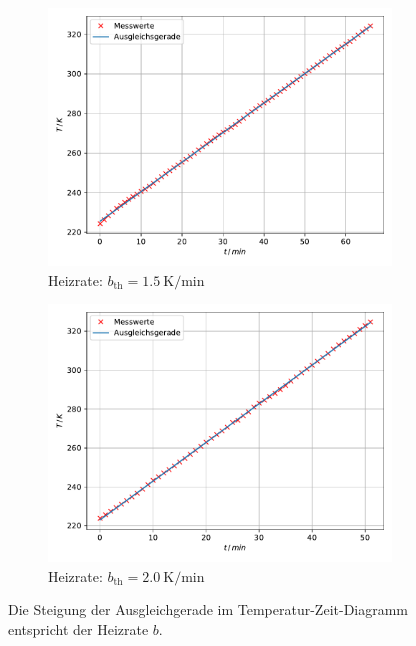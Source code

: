 \begin{figure}
    \begin{subfigure}{0.48\textwidth}
        \centering
        \includegraphics[height=0.8\textwidth]{content/data/char_relaxationszeit_15.pdf}
        \caption{Heizrate: $b_\text{th} = \SI{1.5}{\kelvin \per \minute}$}
        \label{subfig:t_T_15}
    \end{subfigure}
    \hfill
    \begin{subfigure}{0.48\textwidth}
        \centering
        \includegraphics[height=0.8\textwidth]{content/data/char_relaxationszeit_20.pdf}
        \caption{Heizrate: $b_\text{th} = \SI{2.0}{\kelvin \per \minute}$}
        \label{subfig:t_T_20}
    \end{subfigure}
    \caption{Die Steigung der Ausgleichgerade im Temperatur-Zeit-Diagramm entspricht der Heizrate $b$.\cite{matplotlib}\cite{scipy}\cite{numpy}}
    \label{}
\end{figure}
